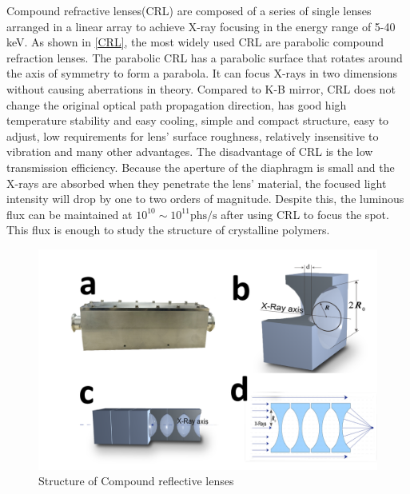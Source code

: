 \documentclass{Head}
\begin{document}
Compound refractive lenses(CRL) are composed of a series of single lenses arranged in a linear array to achieve X-ray focusing in the energy range of 5-40 keV.
As shown in \autoref{CRL}, the most widely used CRL are parabolic compound refraction lenses.
The parabolic CRL has a parabolic surface that rotates around the axis of symmetry to form a parabola.
It can focus X-rays in two dimensions without causing aberrations in theory.
Compared to K-B mirror, CRL does not change the original optical path propagation direction, has good high temperature stability and easy cooling, simple and compact structure, easy to adjust, low requirements for lens' surface roughness, relatively insensitive to vibration and many other advantages.
The disadvantage of CRL is the low transmission efficiency.
Because the aperture of the diaphragm is small and the X-rays are absorbed when they penetrate the lens' material, the focused light intensity will drop by one to two orders of magnitude.
Despite this, the luminous flux can be maintained at $\mathrm{10^{10}\sim 10^{11} phs/s}$ after using CRL to focus the spot.
This flux is enough to study the structure of crystalline polymers.
\begin{figure}
    \centering
    \includegraphics[scale=0.4]{Figures/Fig2CRL.png}
    \caption{Structure of Compound reflective lenses}
    \label{CRL}
\end{figure}
\end{document}
